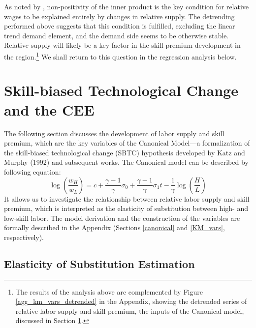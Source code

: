 \documentclass[11pt]{article}
\begin{document}
As noted by \citeauthor{katz1992changes}, non-positivity of the inner product is the key condition for relative wages to be explained entirely by changes in relative supply. The detrending performed above suggests that this condition is fulfilled, excluding the linear trend demand element, and the demand side seems to be otherwise stable. Relative supply will likely be a key factor in the skill premium development in the region.\footnote{The results of the analysis above are complemented by Figure \ref{agg_km_vars_detrended} in the Appendix, showing the detrended series of relative labor supply and skill premium, the inputs of the Canonical model, discussed in Section \ref{skill_bias_cee}.} We shall return to this question in the regression analysis below.


\section{Skill-biased Technological Change and the CEE}\label{skill_bias_cee}

The following section discusses the development of labor supply and skill premium, which are the key variables of the Canonical Model—a formalization of the skill-biased technological change (SBTC) hypothesis developed by Katz and Murphy (1992) and subsequent works. The Canonical model can be described by following equation: 
\begin{equation}
\label{eqn:STBC_regression}
\log(\frac{w_{H}}{w_{L}}) = c + \frac{\gamma - 1}{\gamma}\sigma_0 + \frac{\gamma - 1}{\gamma}\sigma_{1}t - \frac{1}{\gamma}\log(\frac{H}{L})
\end{equation}
It allows us to investigate the relationship between relative labor supply and skill premium,  which is interpreted as the elasticity of substitution between high- and low-skill labor. 
The model derivation and the construction of the variables are formally described in the Appendix (Sections \ref{canonical} and \ref{KM_vars}, respectively).

\subsection{Elasticity of Substitution Estimation}
\end{document}
